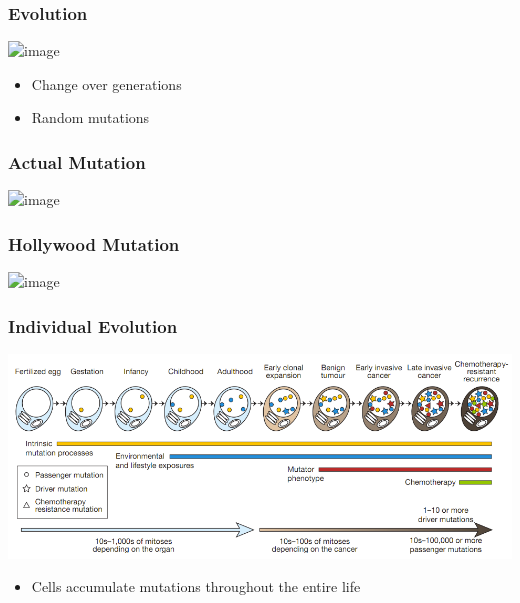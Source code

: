 \begin{frame}
\frametitle{Evolution}

\centering
\includegraphics<1>[height=0.6\textheight]{figures/evolution-desk-720x380.jpg}

\begin{itemize}
  \item
    Change over generations
  \item Random mutations
  \end{itemize}
\end{frame}




\begin{frame}
\frametitle{Actual Mutation}
 
\centering
\includegraphics<1>[height=0.6\textheight]{figures/dna_strand.jpg}

\end{frame}



\begin{frame}
\frametitle{Hollywood Mutation}

\centering
\includegraphics<1>[height=0.85\textheight]{figures/spiderman-spider-bite-comic}
\end{frame}


\begin{frame}
\frametitle{Individual Evolution}

\centering
  \includegraphics[width=\linewidth]{figures/progression}
  \begin{itemize}
    \item
      Cells \alert{accumulate} mutations throughout the entire life
  \end{itemize}
\end{frame}




